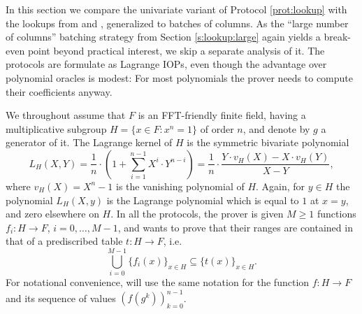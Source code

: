 \documentclass[11pt]{article}
\theoremstyle{definition}
\theoremstyle{definition}
\begin{document}
In this section we compare the univariate variant of Protocol \ref{prot:lookup} with the lookups from \cite{Plookup} and \cite{flookup}, generalized to batches of columns.
As the ``large number of columns'' batching strategy from Section \ref{s:lookup:large}  again yields a break-even point beyond practical interest\footnotemark, we skip a separate analysis of it.
%
The protocols are formulate as Lagrange IOPs, even though the advantage over  polynomial oracles is modest:
For most polynomials the prover needs to compute their coefficients anyway.

We throughout assume that $F$ is an FFT-friendly finite field, having a multiplicative subgroup $H = \{x\in F: x^n = 1\}$ of order $n$, and denote by $g$ a generator of it.  
The Lagrange kernel of $H$ is the symmetric bivariate polynomial
\[
L_H(X, Y) =\frac{1}{n}\cdot\left(1 + \sum_{i=1}^{n-1} X^i\cdot Y^{n-i}\right) = \frac{1}{n}\cdot \frac{Y\cdot v_H(X) - X\cdot v_H(Y)}{X - Y},
\]
where $v_H(X)= X^n - 1$ is the vanishing polynomial of $H$.
Again, for $y\in H$ the polynomial $L_H(X, y)$ is the Lagrange polynomial which is equal to $1$ at  $x=y$, and zero elsewhere on $H$.
In all the protocols, the prover is given $M\geq 1$ functions $f_i:H\rightarrow F$, $i=0, \ldots, M-1$, and wants to prove that their ranges are contained in that of a prediscribed table $t: H\rightarrow F$, i.e. 
\[
\bigcup_{i=0}^{M-1} \{f_i(x)\}_{x\in H}\subseteq \{t(x)\}_{x\in H}.
\]
For notational convenience, will use the same notation for the function $f: H\rightarrow F$ and its sequence of values $(f(g^k))_{k=0}^{n-1}$. 
\end{document}
